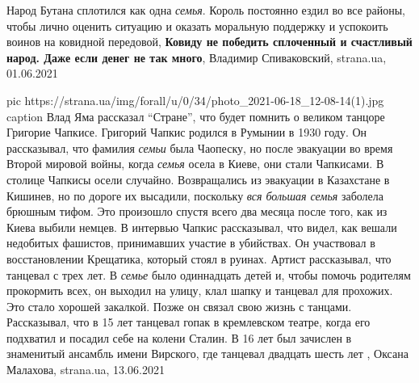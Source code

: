  
 
 
 
 
Народ Бутана сплотился как одна \emph{семья}. Король постоянно ездил во все районы,
чтобы лично оценить ситуацию и оказать моральную поддержку и успокоить воинов
на ковидной передовой, \textbf{Ковиду не победить сплоченный и счастливый
народ. Даже если денег не так много}, Владимир Спиваковский, strana.ua,
01.06.2021

\ifcmt
  pic https://strana.ua/img/forall/u/0/34/photo_2021-06-18_12-08-14(1).jpg
	caption Влад Яма рассказал \enquote{Стране}, что будет помнить о великом танцоре Григорие Чапкисе.
\fi
Григорий Чапкис родился в Румынии в 1930 году. Он рассказывал, что фамилия
\emph{семьи} была Чаопеску, но после эвакуации во время Второй мировой войны,
когда \emph{семья} осела в Киеве, они стали Чапкисами.  В столице Чапкисы осели
случайно.  Возвращались из эвакуации в Казахстане в Кишинев, но по дороге их
высадили, поскольку \emph{вся большая семья} заболела брюшным тифом. Это
произошло спустя всего два месяца после того, как из Киева выбили немцев. В
интервью Чапкис рассказывал, что видел, как вешали недобитых фашистов,
принимавших участие в убийствах. Он участвовал в восстановлении Крещатика,
который стоял в руинах.  Артист рассказывал, что танцевал с трех лет. В
\emph{семье} было одиннадцать детей и, чтобы помочь родителям прокормить всех,
он выходил на улицу, клал шапку и танцевал для прохожих. Это стало хорошей
закалкой.  Позже он связал свою жизнь с танцами. Рассказывал, что в 15 лет
танцевал гопак в кремлевском театре, когда его подхватил и посадил себе на
колени Сталин.  В 16 лет был зачислен в знаменитый ансамбль имени Вирского, где
танцевал двадцать шесть лет
, 
Оксана Малахова, strana.ua, 13.06.2021


